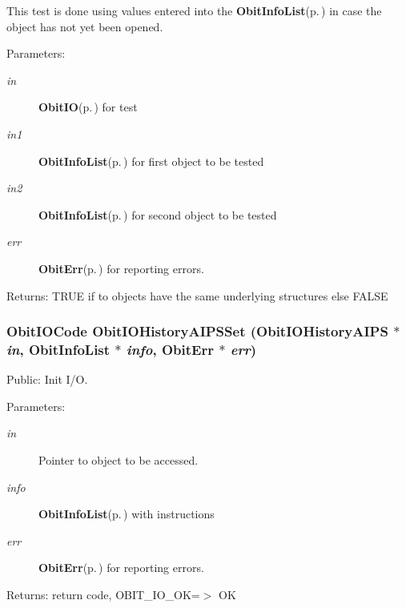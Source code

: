 This test is done using values entered into the {\bf Obit\-Info\-List}{\rm (p.\,\pageref{structObitInfoList})} in case the object has not yet been opened. \begin{Desc}
\item[Parameters:]
\begin{description}
\item[{\em in}]{\bf Obit\-IO}{\rm (p.\,\pageref{structObitIO})} for test \item[{\em in1}]{\bf Obit\-Info\-List}{\rm (p.\,\pageref{structObitInfoList})} for first object to be tested \item[{\em in2}]{\bf Obit\-Info\-List}{\rm (p.\,\pageref{structObitInfoList})} for second object to be tested \item[{\em err}]{\bf Obit\-Err}{\rm (p.\,\pageref{structObitErr})} for reporting errors. \end{description}
\end{Desc}
\begin{Desc}
\item[Returns:]TRUE if to objects have the same underlying structures else FALSE \end{Desc}
\subsubsection{\setlength{\rightskip}{0pt plus 5cm}Obit\-IOCode Obit\-IOHistory\-AIPSSet ({\bf Obit\-IOHistory\-AIPS} $\ast$ {\em in}, {\bf Obit\-Info\-List} $\ast$ {\em info}, {\bf Obit\-Err} $\ast$ {\em err})}\label{ObitIOHistoryAIPS_8h_a13}


Public: Init I/O. 

\begin{Desc}
\item[Parameters:]
\begin{description}
\item[{\em in}]Pointer to object to be accessed. \item[{\em info}]{\bf Obit\-Info\-List}{\rm (p.\,\pageref{structObitInfoList})} with instructions \item[{\em err}]{\bf Obit\-Err}{\rm (p.\,\pageref{structObitErr})} for reporting errors. \end{description}
\end{Desc}
\begin{Desc}
\item[Returns:]return code, OBIT\_\-IO\_\-OK=$>$ OK \end{Desc}
